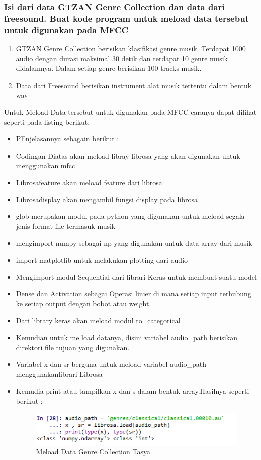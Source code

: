\begin{enumerate}
\begin{itemize}
\subsubsection{Isi dari data GTZAN Genre Collection dan data dari freesound. Buat kode program untuk meload data tersebut untuk digunakan pada MFCC}
\begin{enumerate}
\item GTZAN Genre Collection berisikan klasifikasi genre musik. Terdapat 1000 audio dengan durasi maksimal 30 detik dan terdapat 10 genre musik didalamnya. Dalam setiap genre berisikan 100 tracks musik.
\item Data dari Freesound berisikan instrument alat musik tertentu dalam bentuk wav
\end{enumerate}
Untuk Meload Data tersebut untuk digunakan pada MFCC caranya dapat dilihat seperti pada listing berikut.

\begin{itemize}
\item PEnjelasannya sebagain berikut :\\
\item Codingan Diatas akan meload libray librosa yang akan digunakan untuk menggunakan mfcc
\item Librosa\.feature akan meload feature dari librosa
\item Librosa\.display akan mengambil fungsi display pada librosa
\item glob merupakan modul pada python yang digunakan untuk meload segala jenis format file termasuk musik
\item mengimport numpy sebagai np yang digunakan untuk data array dari musik
\item import matplotlib untuk melakukan plotting dari audio
\item Mengimport modul Sequential dari librari Keras untuk membuat suatu model
\item Dense dan Activation sebagai Operasi linier di mana setiap input terhubung ke setiap output dengan bobot atau weight.
\item Dari library keras akan meload modul to\_categorical
\item Kemudian untuk me load datanya, disini variabel audio\_path berisikan direktori file tujuan yang digunakan.
\item Variabel x dan sr berguna untuk meload variabel audio\_path menggunakanlibrari Librosa
\item Kemudia print atau tampilkan x dan s dalam bentuk array.Hasilnya seperti berikut :
\begin{figure}[ht]
\centering
\includegraphics[scale=0.5]{figures/chapter6tasya23.png}
\caption{Meload Data Genre Collection Tasya}
\label{Praktek}
\end{figure}
\end{itemize}


\end{itemize}
\end{enumerate}
